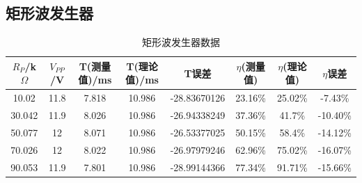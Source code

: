 \documentclass[a4paper]{article}
\begin{document}
\newpage
\subsection{矩形波发生器}%
\begin{table}[!h]
\centering
\caption{矩形波发生器数据}
\label{data2}
\begin{tabular}{|c|c|c|c|c|c|c|c|}
\hline
$R_P$/k$\Omega$ & $V_{PP}$/V & T(测量值)/ms & T(理论值)/ms & T误差    & $\eta$(测量值) & $\eta$(理论值) & $\eta$误差    \\ \hline
10.02           & 11.8          & 7.818     & 10.986    & -28.83670126 & 23.16\%      & 25.02\%      & -7.43\%  \\ \hline
30.042          & 11.9          & 8.026     & 10.986    & -26.94338249 & 37.36\%      & 41.7\%       & -10.40\% \\ \hline
50.077          & 12            & 8.071     & 10.986    & -26.53377025 & 50.15\%      & 58.4\%       & -14.12\% \\ \hline
70.026          & 12            & 8.022     & 10.986    & -26.97979246 & 62.96\%      & 75.02\%      & -16.07\% \\ \hline
90.053          & 11.9          & 7.801     & 10.986    & -28.99144366 & 77.34\%      & 91.71\%      & -15.66\% \\ \hline
\end{tabular}
\end{table}
\end{document}
